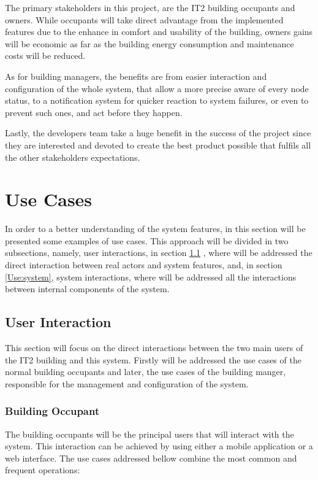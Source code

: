 The primary stakeholders in this project, are the IT2 building occupants and owners. While occupants will take direct advantage from the implemented features due to the enhance in comfort and usability of the building, owners gains will be economic as far as the building energy consumption and maintenance costs will be reduced.

As for building managers, the benefits are from easier interaction and configuration of the whole system, that allow a more precise aware of every node status, to a notification system for quicker reaction to system failures, or even to prevent such ones, and act before they happen.

Lastly, the developers team take a huge benefit in the success of the project since they are interested and devoted to create the best product possible that fulfils all the other stakeholders expectations.


\section{Use Cases}
\label{Architecture:usecases}
In order to a better understanding of the system features, in this section will be presented some examples of use cases. This approach will be divided in two subsections, namely, user interactions, in section \ref{Use:users} , where will be addressed the direct interaction between real actors and system features, and, in section \ref{Use:system}, system interactions, where will be addressed all the interactions between internal components of the system.

\subsection{User Interaction}
\label{Use:users}

This section will focus on the direct interactions between the two main users of the IT2 building and this system. Firstly will be addressed the use cases of the normal building occupants and later, the use cases of the building manger, responsible for the management and configuration of the system.

\subsubsection{Building Occupant}

The building occupants will be the principal users that will interact with the system. This interaction can be achieved by using either a mobile application or a web interface. The use cases addressed bellow combine the most common and frequent operations:

